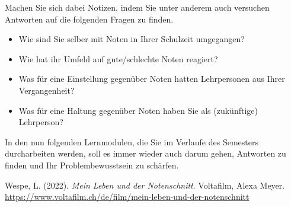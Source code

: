 \documentclass[
  10pt,
  a4paper,
  DIV=11]{scrartcl}
\providecommand{\tightlist}{%
  \setlength{\itemsep}{0pt}\setlength{\parskip}{0pt}}\usepackage{longtable,booktabs,array}
\newlength{\cslhangindent}
\newenvironment{CSLReferences}[2] %
 {\begin{list}{}{%
  \setlength{\itemindent}{0pt}
  \setlength{\leftmargin}{0pt}
  \setlength{\parsep}{0pt}
  \ifodd #1
   \setlength{\leftmargin}{\cslhangindent}
   \setlength{\itemindent}{-1\cslhangindent}
  \fi
  \setlength{\itemsep}{#2\baselineskip}}}
 {\end{list}}
\begin{document}
\begin{tcolorbox}[enhanced jigsaw, opacitybacktitle=0.6, toprule=.15mm, title=\textcolor{quarto-callout-caution-color}{\faFire}\hspace{0.5em}{Aufträge auf LearningView}, bottomrule=.15mm, toptitle=1mm, colframe=quarto-callout-caution-color-frame, opacityback=0, coltitle=black, colback=white, colbacktitle=quarto-callout-caution-color!10!white, left=2mm, leftrule=.75mm, bottomtitle=1mm, rightrule=.15mm, breakable, titlerule=0mm, arc=.35mm]

Machen Sie sich dabei Notizen, indem Sie unter anderem auch versuchen
Antworten auf die folgenden Fragen zu finden.

\begin{itemize}
\tightlist
\item
  Wie sind Sie selber mit Noten in Ihrer Schulzeit umgegangen?
\item
  Wie hat ihr Umfeld auf gute/schlechte Noten reagiert?
\item
  Was für eine Einstellung gegenüber Noten hatten Lehrpersonen aus Ihrer
  Vergangenheit?
\item
  Was für eine Haltung gegenüber Noten haben Sie als (zukünftige)
  Lehrperson?
\end{itemize}

\end{tcolorbox}

In den nun folgenden Lernmodulen, die Sie im Verlaufe des Semesters
durcharbeiten werden, soll es immer wieder auch darum gehen, Antworten
zu finden und Ihr Problembewusstsein zu schärfen.

\label{refs}
\begin{CSLReferences}{1}{0}
Wespe, L. (2022). \emph{Mein Leben und der Notenschnitt}. Voltafilm,
Alexa Meyer.
\url{https://www.voltafilm.ch/de/film/mein-leben-und-der-notenschnitt}

\end{CSLReferences}
\end{document}
